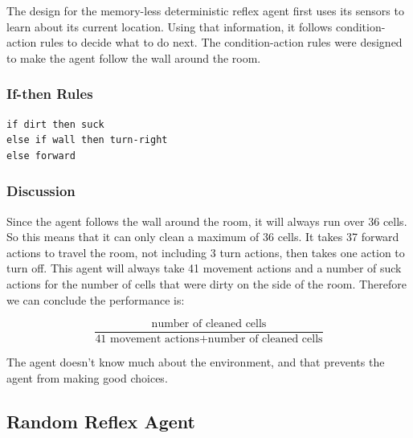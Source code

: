 \documentclass[a4paper,10pt]{article}
\begin{document}
The design for the memory-less deterministic reflex agent first uses its sensors to learn about its current location. Using that information, it follows condition-action rules to decide what to do next. The condition-action rules were designed to make the agent follow the wall around the room.

\subsubsection{If-then Rules}
\begin{verbatim}
if dirt then suck
else if wall then turn-right
else forward
\end{verbatim}

\subsubsection{Discussion}

Since the agent follows the wall around the room, it will always run over 36 cells.
So this means that it can only clean a maximum of 36 cells.
It takes 37 forward actions to travel the room, not including 3 turn actions, then takes one action to turn off.
This agent will always take 41 movement actions and a number of suck actions for the number of cells that were dirty on the side of the room.
Therefore we can conclude the performance is:

\[\frac{\mbox{number of cleaned cells}}{\mbox{41 movement actions} + \mbox{number of cleaned cells}}\]

The agent doesn't know much about the environment, and that prevents the agent from making good choices. 


\subsection{Random Reflex Agent}
\end{document}
